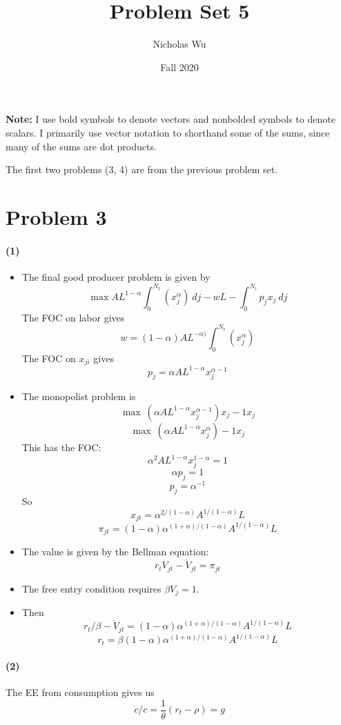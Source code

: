 \documentclass[10pt,letter]{article}
\newcommand{\problem}[1]{\section*{Problem #1}}
\newcommand{\problempart}[1]{\paragraph{#1}}
\begin{document}


\title{Problem Set 5}

\author{Nicholas Wu}

\date{Fall 2020}

\maketitle
\textbf{Note:} I use bold symbols to denote vectors and nonbolded symbols to denote scalars. I primarily use vector notation to shorthand some of the sums, since many of the sums are dot products.

The first two problems (3, 4) are from the previous problem set.
\problem{3}

\problempart{(1)}
\begin{itemize}
  \item The final good producer problem is given by
  \[ \max AL^{1-\alpha} \int_0^{N_t}(x_{j}^\alpha) \ dj - wL - \int_0^{N_t} p_j x_{j} \ dj \]
  The FOC on labor gives
  \[ w = (1-\alpha)AL^{-\alpha) }\int_0^{N_t}(x_{j}^\alpha)  \]
  The FOC on $x_{ji}$ gives
  \[ p_j = \alpha AL^{1-\alpha}x_{j}^{\alpha - 1} \]
  \item The monopolist problem is
  \[ \max \ (\alpha AL^{1-\alpha}x_{j}^{\alpha - 1}) x_{j} - 1 x_{j} \]
  \[ \max \ (\alpha AL^{1-\alpha}x_{j}^{\alpha}) - 1 x_{j} \]
  This has the FOC:
  \[ \alpha^2 AL^{1-\alpha} x_j^{1-\alpha} = 1 \]
  \[ \alpha p_j = 1 \]
  \[ p_j = \alpha^{-1} \]
  So
  \[ x_{jt} = \alpha^{2/(1-\alpha)}A^{1/(1-\alpha)}L \]
  \[ \pi_{jt} = (1-\alpha)\alpha^{(1+\alpha)/(1-\alpha)}A^{1/(1-\alpha)}L \]
  \item The value is given by the Bellman equation:
  \[ r_t V_{jt} - \dot{V}_{jt} = \pi_{jt}  \]
  \item The free entry condition requires $\beta V_j = 1 $.
  \item Then
   \[ r_t/\beta - \dot{V}_{jt} = (1-\alpha)\alpha^{(1+\alpha)/(1-\alpha)}A^{1/(1-\alpha)}L  \]
    \[ r_t = \beta(1-\alpha)\alpha^{(1+\alpha)/(1-\alpha)}A^{1/(1-\alpha)}L  \]
\end{itemize}
\problempart{(2)}
The EE from consumption gives us
\[ \dot{c}/c = \frac{1}{\theta}(r_t-\rho) = g \]
\end{document}
